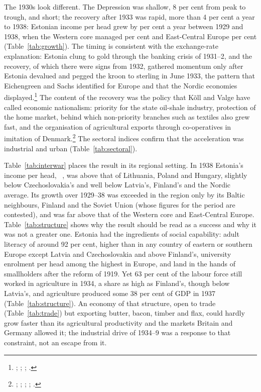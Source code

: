 The 1930s look different. The Depression was shallow, 8 per cent from peak to trough, and short; the recovery after 1933 was rapid, more than 4 per cent a year to 1938: Estonian income per head grew by  per cent a year between 1929 and 1938, when the Western core managed  per cent and East-Central Europe  per cent (Table~\ref{tab:growth}). The timing is consistent with the exchange-rate explanation: Estonia clung to gold through the banking crisis of 1931--2, and the recovery, of which there were signs from 1932, gathered momentum only after Estonia devalued and pegged the kroon to sterling in June 1933, the pattern that Eichengreen and Sachs identified for Europe and that the Nordic economies displayed.\footnote{\autocite[74, 92, 100]{bernankejames01}; \autocite[41]{koll1998policy}; \autocite{RefWorks:doc:5ea847d2e4b0aa025739fe41}; \autocite{grytten_nordicdepression}.} The content of the recovery was the policy that Kõll and Valge have called economic nationalism: priority for the state oil-shale industry, protection of the home market, behind which non-priority branches such as textiles also grew fast, and the organisation of agricultural exports through co-operatives in imitation of Denmark.\footnote{\autocite[13, 21]{koll1998}; \autocite[171--5]{koll1998results}; \autocite[36]{koll1998policy}; \autocite{norkus_denmarkisation}; \autocite[118--35]{klesment2005}.} The sectoral indices confirm that the acceleration was industrial and urban (Table~\ref{tab:sectoral}).

Table~\ref{tab:interwar} places the result in its regional setting. In 1938 Estonia's income per head, ~\intlnineteen{}, was above that of Lithuania, Poland and Hungary, slightly below Czechoslovakia's and well below Latvia's, Finland's and the Nordic average. Its growth over 1929--38 was exceeded in the region only by its Baltic neighbours, Finland and the Soviet Union (whose figures for the period are contested), and was far above that of the Western core and East-Central Europe. Table~\ref{tab:structure} shows why the result should be read as a success and why it was not a greater one. Estonia had the ingredients of social capability: adult literacy of around 92 per cent, higher than in any country of eastern or southern Europe except Latvia and Czechoslovakia and above Finland's, university enrolment per head among the highest in Europe, and land in the hands of smallholders after the reform of 1919. Yet 63 per cent of the labour force still worked in agriculture in 1934, a share as high as Finland's, though below Latvia's, and agriculture produced some 38 per cent of GDP in 1937 (Table~\ref{tab:structure}). An economy of that structure, open to trade (Table~\ref{tab:trade}) but exporting butter, bacon, timber and flax, could hardly grow faster than its agricultural productivity and the markets Britain and Germany allowed it; the industrial drive of 1934--9 was a response to that constraint, not an escape from it.

